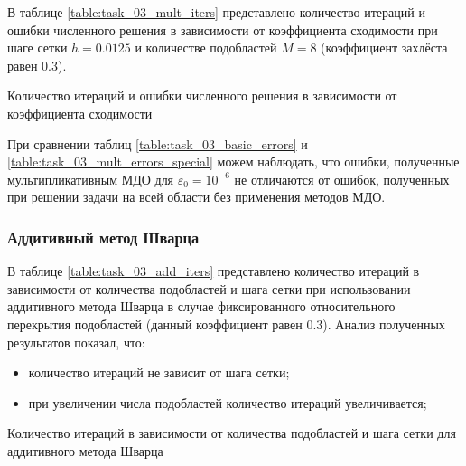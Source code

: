 \documentclass[a4paper]{article}
\begin{document}
В таблице \ref{table:task_03_mult_iters} представлено количество итераций и ошибки численного решения в зависимости от коэффициента сходимости при шаге сетки $h = 0.0125$ и количестве подобластей $M = 8$ (коэффициент захлёста равен 0.3).


\begin{table}[h]
\caption{Количество итераций и ошибки численного решения в зависимости от коэффициента сходимости}
\label{table:task_03_mult_errors_special}
\end{table}

При сравнении таблиц \ref{table:task_03_basic_errors} и \ref{table:task_03_mult_errors_special} можем наблюдать, что ошибки, полученные мультипликативным МДО для $\varepsilon_0 = 10^{-6}$ не отличаются от ошибок, полученных при решении задачи на всей области без применения методов МДО. 

\newpage

\subsubsection{Аддитивный метод Шварца}

В таблице \ref{table:task_03_add_iters} представлено количество итераций в зависимости от количества подобластей и шага сетки при использовании аддитивного метода Шварца в случае фиксированного относительного перекрытия подобластей (данный коэффициент равен 0.3). Анализ полученных результатов показал, что:
\begin{itemize}
\item количество итераций не зависит от шага сетки;
\item при увеличении числа подобластей количество итераций увеличивается;
\end{itemize}

\begin{table}[h]
\caption{Количество итераций в зависимости от количества подобластей и шага сетки для аддитивного метода Шварца}
\label{table:task_03_add_iters}
\end{table}
\end{document}
